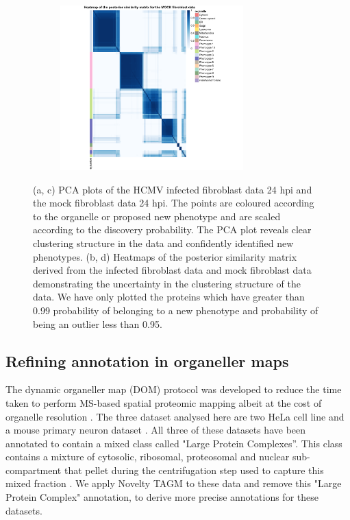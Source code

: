 \documentclass[12pt,english]{article}
\begin{document}
\begin{figure}
\begin{subfigure}[t]{0.5\textwidth}
	\centering
	\includegraphics[height=2.5in]{heatmapMOCK.pdf}
	\caption{}
\end{subfigure}
\caption{(a, c) PCA plots of the HCMV infected fibroblast data 24 hpi and the mock fibroblast data 24 hpi. The points are coloured according to the organelle or proposed new phenotype and are scaled according to the discovery probability. The PCA plot reveals clear clustering structure in the data and confidently identified new phenotypes. (b, d) Heatmaps of the posterior similarity matrix derived from the infected fibroblast data and mock fibroblast data demonstrating the uncertainty in the clustering structure of the data. We have only plotted the proteins which have greater than 0.99 probability of belonging to a new phenotype and probability of being an outlier less than 0.95.}
 \label{figure:Beltran}
\end{figure}
\clearpage
\subsection{Refining annotation in organeller maps}
The dynamic organeller map (DOM) protocol was developed to reduce the time taken to perform MS-based spatial proteomic mapping albeit at the cost of organelle resolution \citep{Itzhak:2016,Gatto:2018}. The three dataset analysed here are two HeLa cell line \citep{Itzhak:2016, Hirst:2018} and a mouse primary neuron dataset \citep{Itzhak::2017}. All three of these datasets have been annotated to contain a mixed class called "Large Protein Complexes''. This class contains a mixture of cytosolic, ribosomal, proteosomal and nuclear sub-compartment that pellet during the centrifugation step used to capture this mixed fraction \citep{Itzhak:2016}. We apply Novelty TAGM to these data and remove this "Large Protein Complex" annotation, to derive more precise annotations for these datasets. 
\end{document}
